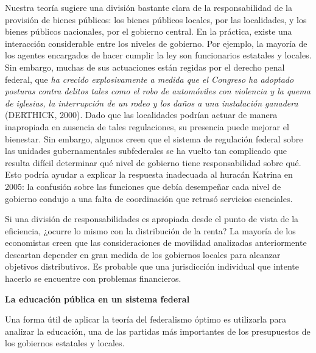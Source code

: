 \documentclass[10pt,a4paper]{article}
\begin{document}
Nuestra teoría sugiere una división bastante clara de la responsabilidad de la provisión de bienes públicos: los bienes públicos locales, por las localidades, y los bienes públicos nacionales, por el gobierno central. En la práctica, existe una interacción considerable entre los niveles de gobierno. Por ejemplo, la mayoría de los agentes encargados de hacer cumplir la ley son funcionarios estatales y locales. Sin embargo, muchas de sus actuaciones están regidas por el derecho penal federal, que \textit{ha crecido explosivamente a medida que el Congreso ha adoptado posturas contra delitos tales como el robo de automóviles con violencia y la quema de iglesias, la interrupción de un rodeo y los daños a una instalación ganadera} (DERTHICK, 2000). Dado que las localidades podrían actuar de manera inapropiada en ausencia de tales regulaciones, su presencia puede mejorar el bienestar. Sin embargo, algunos creen que el sistema de regulación federal sobre las unidades gubernamentales subfederales se ha vuelto tan complicado que resulta difícil determinar qué nivel de gobierno tiene responsabilidad sobre qué. Esto podría ayudar a explicar la respuesta inadecuada al huracán Katrina en 2005: la confusión sobre las funciones que debía desempeñar cada nivel de gobierno condujo a una falta de coordinación que retrasó servicios esenciales.

Si una división de responsabilidades es apropiada desde el punto de vista de la eficiencia, ¿ocurre lo mismo con la distribución de la renta? La mayoría de los economistas creen que las consideraciones de movilidad analizadas anteriormente descartan depender en gran medida de los gobiernos locales para alcanzar objetivos distributivos. Es probable que una jurisdicción individual que intente hacerlo se encuentre con problemas financieros. 

\textbf{La educación pública en un sistema federal}

Una forma útil de aplicar la teoría del federalismo óptimo es utilizarla para analizar la educación, una de las partidas más importantes de los presupuestos de los gobiernos estatales y locales. 
\end{document}
